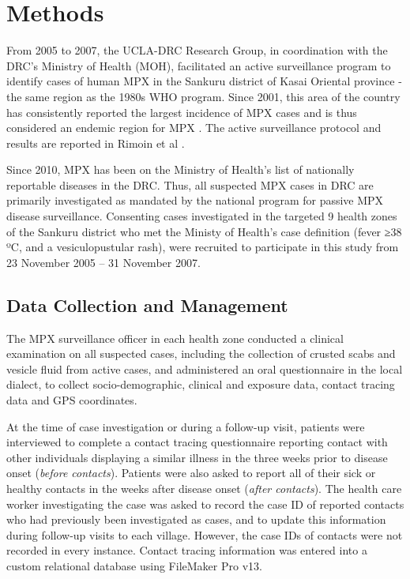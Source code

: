 \section{Methods}

From 2005 to 2007, the UCLA-DRC Research Group, in coordination with the DRC’s Ministry of Health (MOH), facilitated an active surveillance program to identify cases of human MPX in the Sankuru district of Kasai Oriental province - the same region as the 1980s WHO program. Since 2001, this area of the country has consistently reported the largest incidence of MPX cases and is thus considered an endemic region for MPX \cite{Rimoin2010}. The active surveillance protocol and results are reported in Rimoin et al \cite{Rimoin2010}.

Since 2010, MPX has been on the Ministry of Health's list of nationally reportable diseases in the DRC. Thus, all suspected MPX cases in DRC are primarily investigated as mandated by the national program for passive MPX disease surveillance. Consenting cases investigated in the targeted 9 health zones of the Sankuru district who met the  Ministy of Health’s case definition (fever ≥38 ºC, and a vesiculopustular rash), were recruited to participate in this study from 23 November 2005 – 31 November 2007. 

\subsection{Data Collection and Management}
The MPX surveillance officer in each health zone conducted a clinical examination on all suspected cases, including the collection of crusted scabs and vesicle fluid from active cases, and administered an oral questionnaire in the local dialect, to collect socio-demographic, clinical and exposure data, contact tracing data and GPS coordinates.

At the time of case investigation or during a follow-up visit, patients were interviewed to complete a contact tracing questionnaire reporting contact with other individuals displaying a similar illness in the three weeks prior to disease onset  (\textit{before contacts}). Patients were also asked to report all of their sick or healthy contacts in the weeks after disease onset (\textit{after contacts}). The health care worker investigating the case was asked to record the case ID of reported contacts who had previously been investigated as cases, and to update this information during follow-up visits to each village. However, the case IDs of contacts were not recorded in every instance. Contact tracing information was entered into a custom relational database using FileMaker Pro v13.


